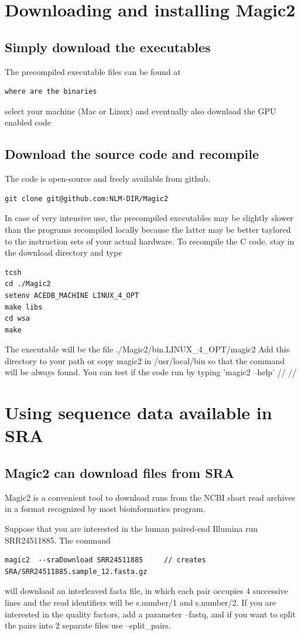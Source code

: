 \documentclass[11pt]{article}
\newcommand{\BL}{\begin{lstlisting}}
\begin{document}
\section {Downloading and installing Magic2}

\subsection {Simply download the executables}

The precompiled executable files can be found at
\BL
where are the binaries
\end{lstlisting}
select your machine (Mac or Linux) and eventually also download the GPU enabled code

\subsection{Download the source code and recompile}

The code is open-source and freely available from github.
\BL
git clone git@github.com:NLM-DIR/Magic2
\end{lstlisting}

In case of very intensive use,
the precompiled executables may be slightly slower than the programs recompiled locally
because the latter may be better taylored to the instruction sets of your actual hardware.
To recompile the C code. stay in the download directory and type
\BL
tcsh
cd ./Magic2
setenv ACEDB_MACHINE LINUX_4_OPT
make libs
cd wsa
make
\end{lstlisting}
The executable will be the file ./Magic2/bin.LINUX\_4\_OPT/magic2
Add this directory to your path or copy magic2 in /usr/local/bin
so that the command will be always found. You can test if the code run
by typing 'magic2 --help'
//
//
\section {Using sequence data available in SRA}
\subsection {Magic2 can download files from SRA}

Magic2 is a convenient tool to download runs from the NCBI short read archives
in a format recognized by most bioinformatics program.

Suppose that you are interested in the human paired-end Illumina run SRR24511885.
The command
\BL
magic2  --sraDownload SRR24511885     // creates SRA/SRR24511885.sample_12.fasta.gz
\end{lstlisting}
will download an interleaved fasta file, in which each pair occupies 4 successive lines
and the read identifiers will be s.number/1 and s.number/2.
If you are interested in the quality factors, add a parameter --fastq, and if you
want to split the pairs into 2 separate files use --split\_pairs.
\end{document}
